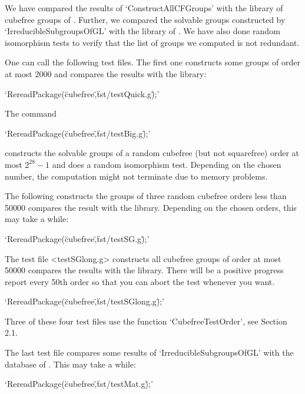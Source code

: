 %
%




We have compared the results of `ConstructAllCFGroups' with the library of
cubefree groups of {\SmallGroups}. Further, we compared the 
solvable groups constructed by `IrreducibleSubgroupsOfGL' with the library of
{\IrredSol}. We have also done random isomorphism tests to verify that the
list of groups we computed is not redundant. 

One can call the following test files. The first one constructs some groups of order at most 2000 and compares the results with the
{\SmallGroups} library:


`RereadPackage(\"cubefree\",\"tst/testQuick.g\");'


The command

`RereadPackage(\"cubefree\",\"tst/testBig.g\");'

constructs the solvable groups of a random cubefree (but not squarefree) order at most $2^{28}-1$ and does a random isomorphism test. Depending on the chosen number, the computation might not terminate due to memory problems.



The following constructs the groups of three random cubefree orders less than 50000 compares the result with the
{\SmallGroups} library. Depending on the chosen orders, this may take a while:

`RereadPackage(\"cubefree\",\"tst/testSG.g\");'


The test file <testSGlong.g> constructs all cubefree groups of order at most
50000 compares the results with the
{\SmallGroups} library. There will be a positive progress report every 50th
order so that you can abort the test whenever you want.

`RereadPackage(\"cubefree\",\"tst/testSGlong.g\");'

Three of these four test files use the function `CubefreeTestOrder', see Section 2.1. 

The last test file compares some results of `IrreducibleSubgroupsOfGL' with the
database of {\IrredSol}. This may take a while:

`RereadPackage(\"cubefree\",\"tst/testMat.g\");'





